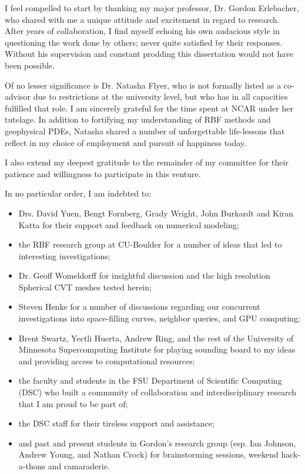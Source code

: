 \begin{acknowledgments}

I feel compelled to start by thanking my major professor, Dr. Gordon Erlebacher, who shared with me a unique attitude and excitement in regard to research. After years of collaboration, I find myself echoing his own audacious style in questioning the work done by others; never quite satisfied by their responses. Without his supervision and constant prodding this dissertation would not have been possible. %

Of no lesser significance is Dr. Natasha Flyer, who is not formally listed as a co-advisor due to restrictions at the university level, but who has in all capacities fulfilled that role. I am sincerely grateful for the time spent at NCAR under her tutelage. In addition to fortifying my understanding of RBF methods and geophysical PDEs, Natasha shared a number of unforgettable life-lessons that reflect in my choice of employment and pursuit of happiness today. 

I also extend my deepest gratitude to the remainder of my committee for their patience and willingness to participate in this venture. 

In no particular order, I am indebted to:
\begin{itemize}
\item Drs. David Yuen, Bengt Fornberg, Grady Wright, John Burkardt and Kiran Katta for their support and feedback on numerical modeling;
\item the RBF research group at CU-Boulder for a number of ideas that led to interesting investigations;
\item Dr. Geoff Womeldorff for insightful discussion and the high resolution Spherical CVT meshes tested herein;
\item Steven Henke for a number of discussions regarding our concurrent investigations into space-filling curves, neighbor queries, and GPU computing;
\item Brent Swartz, Yectli Huerta, Andrew Ring, and the rest of the University of Minnesota Supercomputing Institute for playing sounding board to my ideas and providing access to computational resources;
\item the faculty and students in the FSU Department of Scientific Computing (DSC) who built a community of collaboration and interdisciplinary research that I am proud to be part of;
\item the DSC staff for their tireless support and assistance;  
\item and past and present students in Gordon's research group (esp. Ian Johnson, Andrew Young, and Nathan Crock) for brainstorming sessions, weekend hack-a-thons and camaraderie.
\end{itemize}


\end{acknowledgments}
